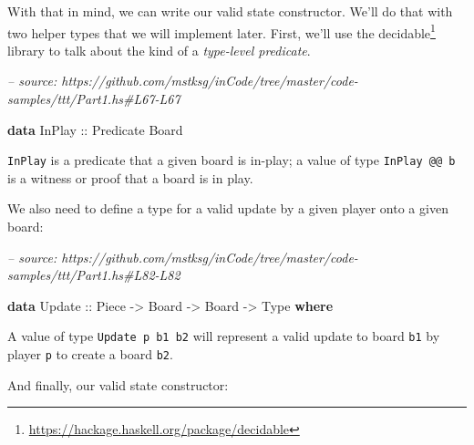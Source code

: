 \documentclass[]{article}
\newenvironment{Shaded}{}{}
\newcommand{\CommentTok}[1]{\textcolor[rgb]{0.38,0.63,0.69}{\textit{#1}}}
\newcommand{\DataTypeTok}[1]{\textcolor[rgb]{0.56,0.13,0.00}{#1}}
\newcommand{\KeywordTok}[1]{\textcolor[rgb]{0.00,0.44,0.13}{\textbf{#1}}}
\newcommand{\OtherTok}[1]{\textcolor[rgb]{0.00,0.44,0.13}{#1}}
\renewcommand{\href}[2]{#2\footnote{\url{#1}}}
\begin{document}
With that in mind, we can write our valid state constructor. We'll do that with
two helper types that we will implement later. First, we'll use the
\href{https://hackage.haskell.org/package/decidable}{decidable} library to talk
about the kind of a \emph{type-level predicate}.

\begin{Shaded}
\begin{Highlighting}[]
\CommentTok{-- source: https://github.com/mstksg/inCode/tree/master/code-samples/ttt/Part1.hs#L67-L67}

\KeywordTok{data} \DataTypeTok{InPlay}\OtherTok{ ::} \DataTypeTok{Predicate} \DataTypeTok{Board}
\end{Highlighting}
\end{Shaded}

\texttt{InPlay} is a predicate that a given board is in-play; a value of type
\texttt{InPlay\ @@\ b} is a witness or proof that a board is in play.

We also need to define a type for a valid update by a given player onto a given
board:

\begin{Shaded}
\begin{Highlighting}[]
\CommentTok{-- source: https://github.com/mstksg/inCode/tree/master/code-samples/ttt/Part1.hs#L82-L82}

\KeywordTok{data} \DataTypeTok{Update}\OtherTok{ ::} \DataTypeTok{Piece} \OtherTok{->} \DataTypeTok{Board} \OtherTok{->} \DataTypeTok{Board} \OtherTok{->} \DataTypeTok{Type} \KeywordTok{where}
\end{Highlighting}
\end{Shaded}

A value of type \texttt{Update\ p\ b1\ b2} will represent a valid update to
board \texttt{b1} by player \texttt{p} to create a board \texttt{b2}.

And finally, our valid state constructor:
\end{document}
